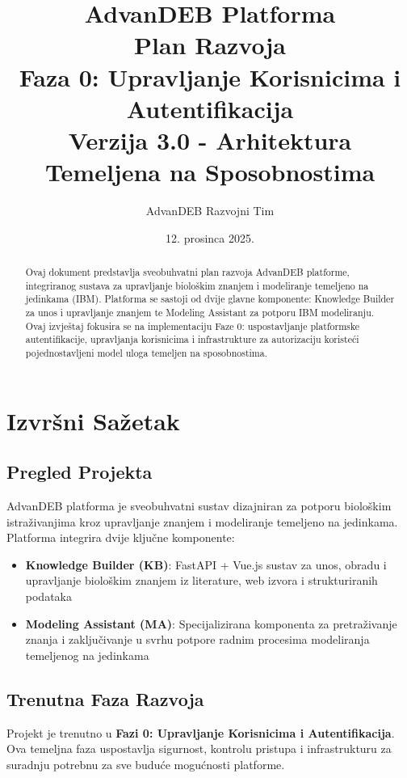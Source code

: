 \documentclass[12pt,a4paper]{article}
\title{
    \textbf{\Huge \textcolor{titlecolor}{AdvanDEB Platforma}}\\
    \vspace{0.5cm}
    \Large Plan Razvoja\\
    \large Faza 0: Upravljanje Korisnicima i Autentifikacija\\
    \vspace{0.3cm}
    \normalsize Verzija 3.0 - Arhitektura Temeljena na Sposobnostima
}
\author{AdvanDEB Razvojni Tim}
\date{12. prosinca 2025.}
\begin{document}
\maketitle
\thispagestyle{empty}

\vspace{2cm}

\begin{abstract}
Ovaj dokument predstavlja sveobuhvatni plan razvoja AdvanDEB platforme, integriranog sustava za upravljanje biološkim znanjem i modeliranje temeljeno na jedinkama (IBM). Platforma se sastoji od dvije glavne komponente: Knowledge Builder za unos i upravljanje znanjem te Modeling Assistant za potporu IBM modeliranju. Ovaj izvještaj fokusira se na implementaciju Faze 0: uspostavljanje platformske autentifikacije, upravljanja korisnicima i infrastrukture za autorizaciju koristeći pojednostavljeni model uloga temeljen na sposobnostima.
\end{abstract}

\newpage
\tableofcontents
\newpage

\section{Izvršni Sažetak}

\subsection{Pregled Projekta}
AdvanDEB platforma je sveobuhvatni sustav dizajniran za potporu biološkim istraživanjima kroz upravljanje znanjem i modeliranje temeljeno na jedinkama. Platforma integrira dvije ključne komponente:

\begin{itemize}[leftmargin=*]
    \item \textbf{Knowledge Builder (KB)}: FastAPI + Vue.js sustav za unos, obradu i upravljanje biološkim znanjem iz literature, web izvora i strukturiranih podataka
    \item \textbf{Modeling Assistant (MA)}: Specijalizirana komponenta za pretraživanje znanja i zaključivanje u svrhu potpore radnim procesima modeliranja temeljenog na jedinkama
\end{itemize}

\subsection{Trenutna Faza Razvoja}
Projekt je trenutno u \textbf{Fazi 0: Upravljanje Korisnicima i Autentifikacija}. Ova temeljna faza uspostavlja sigurnost, kontrolu pristupa i infrastrukturu za suradnju potrebnu za sve buduće mogućnosti platforme.
\end{document}
